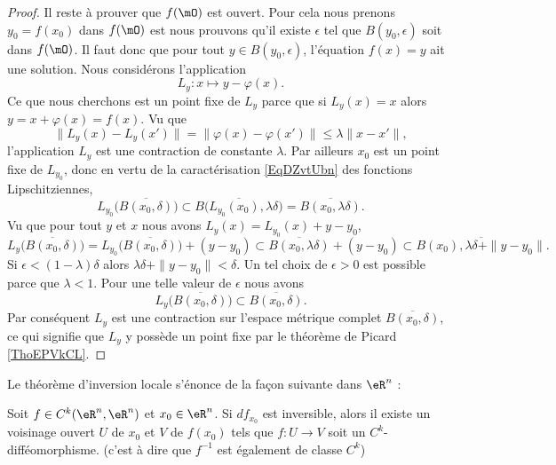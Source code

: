 \begin{proof}
    Il reste à prouver que \( f(\mO)\) est ouvert. Pour cela nous prenons \( y_0=f(x_0)\) dans \( f(\mO)\) est nous prouvons qu'il existe \( \epsilon\) tel que \( B(y_0,\epsilon)\) soit dans \( f(\mO)\). Il faut donc que pour tout \( y\in B(y_0,\epsilon)\), l'équation \( f(x)=y\) ait une solution. Nous considérons l'application
    \begin{equation}
        L_y\colon x\mapsto y-\varphi(x).
    \end{equation}
    Ce que nous cherchons est un point fixe de \( L_y\) parce que si \( L_y(x)=x\) alors \( y=x+\varphi(x)=f(x)\). Vu que
    \begin{equation}
        \big\| L_y(x)-L_y(x') \big\|=\big\| \varphi(x)-\varphi(x') \big\|\leq\lambda\| x-x' \|,
    \end{equation}
    l'application \( L_y\) est une contraction de constante \( \lambda\). Par ailleurs \( x_0\) est un point fixe de \( L_{y_0}\), donc en vertu de la caractérisation \eqref{EqDZvtUbn} des fonctions Lipschitziennes, 
    \begin{equation}
        L_{y_0}\big( \overline{ B(x_0,\delta) } \big)\subset \overline{ B\big( L_{y_0}(x_0),\lambda\delta \big) }=\overline{ B(x_0,\lambda\delta) }.
    \end{equation}
    Vu que pour tout \( y\) et \( x\) nous avons \( L_y(x)=L_{y_0}(x)+y-y_0\),
    \begin{equation}
    L_y\big( \overline{ B(x_0,\delta) } \big)=L_{y_0}\big( \overline{ B(x_0,\delta) } \big)+(y-y_0)\subset \overline{ B(x_0,\lambda\delta) }+(y-y_0)\subset \overline{ B(x_0),\lambda\delta+\| y-y_0 \| }.
    \end{equation}
    Si \( \epsilon<(1-\lambda)\delta\) alors \( \lambda\delta+\| y-y_0 \|<\delta\). Un tel choix de \( \epsilon>0\) est possible parce que \( \lambda<1\). Pour une telle valeur de \( \epsilon\) nous avons
    \begin{equation}
        L_y\big( \overline{ B(x_0,\delta) } \big)\subset \overline{ B(x_0,\delta) }.
    \end{equation}
    Par conséquent \( L_y\) est une contraction sur l'espace métrique complet \( \overline{ B(x_0,\delta) }\), ce qui signifie que \( L_y\) y possède un point fixe par le théorème de Picard \ref{ThoEPVkCL}.
\end{proof}

Le théorème d'inversion locale s'énonce de la façon suivante dans \( \eR^n\) :
\begin{theorem}    \label{THOooQGGWooPBRNEX}      %
    Soit \( f\in C^k(\eR^n,\eR^n)\) et \( x_0\in \eR^n\). Si \( df_{x_0}\) est inversible, alors il existe un voisinage ouvert \( U\) de \( x_0\) et \( V\) de \( f(x_0)\) tels que \( f\colon U\to V\) soit un \( C^k\)-difféomorphisme. (c'est à dire que \( f^{-1}\) est également de classe \( C^k\))
\end{theorem}

